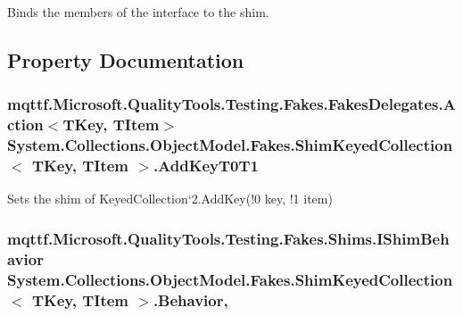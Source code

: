Binds the members of the interface to the shim.



\subsection{Property Documentation}
\hypertarget{class_system_1_1_collections_1_1_object_model_1_1_fakes_1_1_shim_keyed_collection_3_01_t_key_00_01_t_item_01_4_a2baf4d8d1c059061319c1bc2c2ed00de}{
\subsubsection[{Add\-Key\-T0\-T1}]{\setlength{\rightskip}{0pt plus 5cm}mqttf.\-Microsoft.\-Quality\-Tools.\-Testing.\-Fakes.\-Fakes\-Delegates.\-Action$<$T\-Key, T\-Item$>$ System.\-Collections.\-Object\-Model.\-Fakes.\-Shim\-Keyed\-Collection$<$ T\-Key, T\-Item $>$.Add\-Key\-T0\-T1\hspace{0.3cm}{\ttfamily [set]}}}\label{class_system_1_1_collections_1_1_object_model_1_1_fakes_1_1_shim_keyed_collection_3_01_t_key_00_01_t_item_01_4_a2baf4d8d1c059061319c1bc2c2ed00de}


Sets the shim of Keyed\-Collection`2.Add\-Key(!0 key, !1 item)

\hypertarget{class_system_1_1_collections_1_1_object_model_1_1_fakes_1_1_shim_keyed_collection_3_01_t_key_00_01_t_item_01_4_a29dfe9dc8b60971fcb47fb3dd01014a3}{
\subsubsection[{Behavior}]{\setlength{\rightskip}{0pt plus 5cm}mqttf.\-Microsoft.\-Quality\-Tools.\-Testing.\-Fakes.\-Shims.\-I\-Shim\-Behavior System.\-Collections.\-Object\-Model.\-Fakes.\-Shim\-Keyed\-Collection$<$ T\-Key, T\-Item $>$.Behavior\hspace{0.3cm}{\ttfamily [static]}, {\ttfamily [set]}}}\label{class_system_1_1_collections_1_1_object_model_1_1_fakes_1_1_shim_keyed_collection_3_01_t_key_00_01_t_item_01_4_a29dfe9dc8b60971fcb47fb3dd01014a3}


